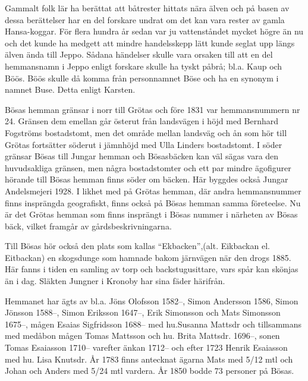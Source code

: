 %



Gammalt folk lär ha berättat att båtrester hittats nära älven och på basen av dessa berättelser har en del forskare undrat om det kan vara rester av gamla Hansa-koggar. För flera hundra år sedan var ju vattenståndet mycket högre än nu och det kunde ha medgett att mindre handelsskepp lätt kunde seglat upp längs älven ända till Jeppo. Sådana händelser skulle vara orsaken till att en del hemmansnamn i Jeppo enligt forskare skulle ha tyskt påbrå; bl.a. Kaup och Böös. Böös skulle då komma från personnamnet Böse och ha en synonym i namnet Buse. Detta enligt Karsten.

Bösas hemman gränsar i norr till Grötas och före 1831 var hemmansnummern nr 24. Gränsen dem emellan går österut från landsvägen i höjd med Bernhard Fogströms bostadstomt, men det område mellan landsväg  och ån som hör till Grötas fortsätter söderut i jämnhöjd med Ulla Linders bostadstomt. I söder gränsar Bösas till Jungar hemman och Bösasbäcken kan väl sägas vara den huvudsakliga gränsen, men några bostadstomter och ett par mindre ägofigurer hörande till Bösas hemman finns söder om bäcken. Här byggdes också Jungar Andelsmejeri 1928. I likhet med på Grötas hemman, där andra hemmansnummer finns insprängda geografiskt, finns också på Bösas hemman samma företeelse. Nu är det Grötas hemman som finns insprängt i Bösas nummer i närheten av Bösas bäck, vilket framgår av gårdsbeskrivningarna.

Till Bösas hör också den plats som kallas ``Ekbacken'',(alt. Eikbackan el. Eitbackan) en skogsdunge som hamnade bakom järnvägen när den drogs 1885. Här fanns i tiden en samling av torp och backstugusittare, vars spår kan skönjas än i dag. Släkten Jungner i Kronoby har sina fäder härifrån.

Hemmanet har ägts av bl.a. Jöns Olofsson 1582--, Simon Andersson 1586, Simon Jönsson 1588--, Simon Eriksson 1647--, Erik Simonsson och Mats Simonsson 1675--,  mågen Esaias Sigfridsson 1688-- med hu.Susanna Mattsdr och tillsammans med medåbon mågen Tomas Mattsson och hu. Brita Mattsdr. 1696--, sonen Tomas Esaiasson 1710-- varefter änkan 1712-- och efter 1723 Henrik Esaiasson med hu. Lisa Knutsdr. År 1783 finns antecknat ägarna Mats med 5/12 mtl och Johan och Anders med 5/24 mtl vardera. År 1850 bodde 73 personer på Bösas.

